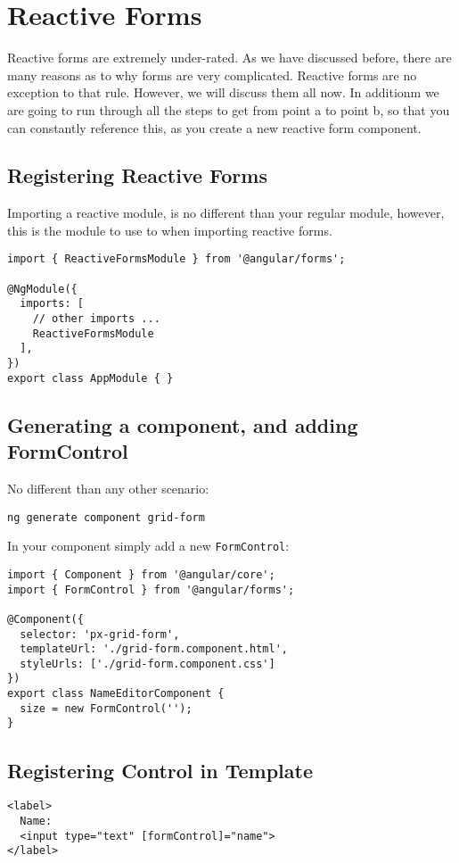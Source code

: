 
\chapter{ Reactive Forms }

Reactive forms are extremely under-rated. As we have discussed before, there are 
many reasons as to why forms are very complicated. Reactive forms are no 
exception to that rule. However, we will discuss them all now. In additionm we
are going to run through all the steps to get from point a to point b, so that
you can constantly reference this, as you create a new reactive form component.

\section{ Registering Reactive Forms }

Importing a reactive module, is no different than your regular module, however,
this is the module to use to when importing reactive forms. 

\begin{lstlisting}
import { ReactiveFormsModule } from '@angular/forms';

@NgModule({
  imports: [
    // other imports ...
    ReactiveFormsModule
  ],
})
export class AppModule { }
\end{lstlisting}

\section{Generating a component, and adding FormControl}
No different than any other scenario: 
\begin{verbatim}
ng generate component grid-form 
\end{verbatim}

In your component simply add a new \lstinline{FormControl}: 

\begin{lstlisting}
import { Component } from '@angular/core';
import { FormControl } from '@angular/forms';

@Component({
  selector: 'px-grid-form',
  templateUrl: './grid-form.component.html',
  styleUrls: ['./grid-form.component.css']
})
export class NameEditorComponent {
  size = new FormControl('');
}
\end{lstlisting}

\section{Registering Control in Template}
\begin{lstlisting}
<label>
  Name:
  <input type="text" [formControl]="name">
</label>
\end{lstlisting}

